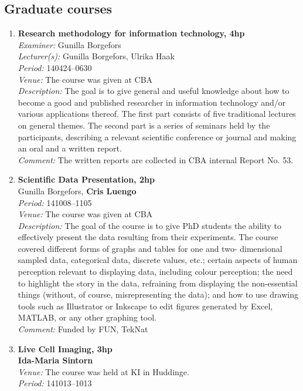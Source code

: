 \subsection{Graduate courses}
{\small
\begin{enumerate}
%
\item
{\bf Research methodology for information technology, 4hp}~\\
{\em Examiner:} Gunilla Borgefors~\\
{\em Lecturer(s):} Gunilla Borgefors, Ulrika Haak~\\
{\em Period:} 140424--0630~\\
{\em Venue:} The course was given at CBA\\
{\em Description:} The goal is to give general and useful knowledge about how to become a good and published researcher in information technology and/or various applications thereof. The first  part consists of five traditional lectures on general themes. The  second  part is a series of seminars held by the participants, describing a relevant scientific conference or journal and making an oral and a written report.~\\
{\em Comment:} The written reports are collected in CBA internal Report No. 53.
%
\item
{\bf Scientific Data Presentation, 2hp}\\
Gunilla Borgefors, {\bf Cris Luengo}\\
{\em Period:} 141008--1105\\
{\em Venue:} The course was given at CBA\\
{\em Description:} The goal of the course is to give PhD students the ability to effectively present the data resulting from their experiments. The course covered different forms of graphs and tables for one and two- dimensional sampled data, categorical data, discrete values, etc.; certain aspects of human perception relevant to displaying data, including colour perception; the need to highlight the story in the data, refraining from displaying the non-essential things (without, of course, misrepresenting the data); and how to use drawing tools such as Illustrator or Inkscape to edit figures generated by Excel, MATLAB, or any other graphing tool. \\
 {\em Comment:} Funded by FUN, TekNat

\item
{\bf Live Cell Imaging, 3hp}~\\
{\bf Ida-Maria Sintorn}~\\
{\em Venue:} The course was held at KI in Huddinge.~\\
{\em Period:} 141013--1013
%


\end{enumerate}}
